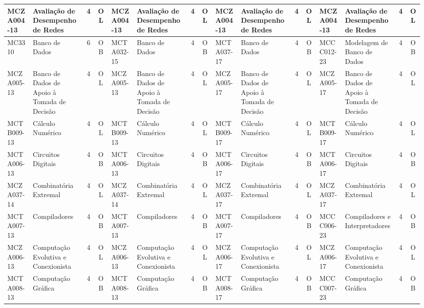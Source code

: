 \documentclass[a4paper]{article}
\begin{document}
\begin{landscape}
{\begin{longtable}{|l|p{.15\textheight}|c|c||l|p{.15\textheight}|c|c||l|p{.15\textheight}|c|c||l|p{.15\textheight}|c|c|}
    MCZA004-13 & Avaliação de Desempenho de Redes & 4 & OL &
    MCZA004-13 & Avaliação de Desempenho de Redes & 4 & OL &
    MCZA004-13 & Avaliação de Desempenho de Redes & 4 & OL &
    MCZA004-13 & Avaliação de Desempenho de Redes & 4 & OL \\ \hline

    MC3310 & Banco de Dados & 6 & OB &
    MCTA032-15 & Banco de Dados & 4 & OB &
    MCTA037-17 & Banco de Dados & 4 & OB &
    MCCC012-23 & Modelagem de Banco de Dados & 4 & OB \\ \hline

    MCZA005-13 & Banco de Dados de Apoio à Tomada de Decisão & 4 & OL &
    MCZA005-13 & Banco de Dados de Apoio à Tomada de Decisão & 4 & OL &
    MCZA005-17 & Banco de Dados de Apoio à Tomada de Decisão & 4 & OL &
    MCZA005-17 & Banco de Dados de Apoio à Tomada de Decisão & 4 & OL\\ \hline

    MCTB009-13 & Cálculo Numérico & 4 & OL &
    MCTB009-13 & Cálculo Numérico & 4 & OL &
    MCTB009-17 & Cálculo Numérico & 4 & OL &
    MCTB009-17 & Cálculo Numérico & 4 & OL\\ \hline
    
    MCTA006-13 & Circuitos Digitais & 4 & OB &
    MCTA006-13 & Circuitos Digitais & 4 & OB &
    MCTA006-17 & Circuitos Digitais & 4 & OB &
    MCTA006-17 & Circuitos Digitais & 4 & OB \\ \hline

    MCZA037-14 & Combinatória Extremal & 4 & OL &
    MCZA037-14 & Combinatória Extremal & 4 & OL &
    MCZA037-17 & Combinatória Extremal & 4 & OL &
    MCZA037-17 & Combinatória Extremal & 4 & OL \\ \hline
    
    MCTA007-13 & Compiladores & 4 & OB &
    MCTA007-13 & Compiladores & 4 & OB &
    MCTA007-17 & Compiladores & 4 &  OB &
    MCCC006-23 & Compiladores e Interpretadores & 4 & OB \\ \hline

    MCZA006-13 & Computação Evolutiva e Conexionista & 4 & OL &
    MCZA006-13 & Computação Evolutiva e Conexionista & 4 & OL &
    MCZA006-17 & Computação Evolutiva e Conexionista & 4 & OL &
    MCZA006-17 & Computação Evolutiva e Conexionista & 4 & OL \\ \hline

    
    MCTA008-13 & Computação Gráfica & 4 & OB &
    MCTA008-13 & Computação Gráfica & 4 & OB &
    MCTA008-17 & Computação Gráfica & 4 & OB &
    MCCC007-23 & Computação Gráfica & 4 & OB \\ \hline


\end{longtable}}
\end{landscape}
\end{document}
